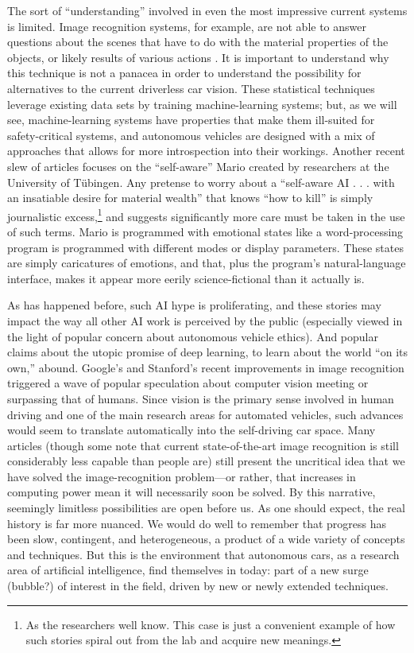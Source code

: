 The sort of ``understanding''
involved in even the most impressive current systems is limited. Image
recognition systems, for example, are not
able to answer questions about the scenes that have to do with
the material properties of the objects, or likely results of various
actions \cite{gomesJordan}. It is important to understand why this technique is not a
panacea in order to understand the possibility for alternatives to the current
driverless car vision. These statistical techniques leverage existing data
sets by training machine-learning systems; but, as we will see,
machine-learning systems have properties that make them ill-suited for
safety-critical systems, and autonomous vehicles are designed with a
mix of approaches that allows for more introspection into their
workings. Another recent slew of articles focuses on
the ``self-aware'' Mario created by researchers at the University of
T\"{u}bingen. Any pretense to worry about a ``self-aware AI . . . with
an insatiable desire for material wealth'' that knows ``how to kill'' \cite{vincentMario}
is simply journalistic excess,\footnote{As the
  researchers well know. This case is just a convenient example of how
such stories spiral out from the lab and acquire new meanings.} and suggests
significantly more care must be taken in the use of such terms. Mario
is programmed with emotional states like a word-processing program is
programmed with different modes or display parameters. These states
are simply caricatures of emotions, and that, plus the program's
natural-language interface, makes it appear more eerily science-fictional than it
actually is.

As has happened before, such AI hype is proliferating, and these
stories may impact the way all other AI work is
perceived by the public (especially viewed in the light of
popular concern about autonomous vehicle ethics). And popular claims
about the utopic promise of deep learning, to
learn about the world ``on its own,''
abound. Google's and Stanford's recent
improvements in image recognition \cite{markoffImage} triggered a wave
of popular speculation about computer vision meeting or surpassing
that of humans. Since vision is the primary sense involved in human driving
and one of the main research areas for automated vehicles, such
advances would seem to translate automatically into the self-driving
car space. Many articles (though some note that current
state-of-the-art image recognition is still considerably less capable
than people are) still present the uncritical idea that we have solved
the image-recognition problem---or rather, that increases in computing
power mean it will necessarily soon be solved. By this narrative, seemingly limitless
possibilities are open before us. As one should expect, the real
history is far more nuanced. We would do well to remember that
progress has been slow, contingent, and heterogeneous, a product of a
wide variety of concepts and techniques. But
this is the environment that autonomous cars, as a
research area of artificial intelligence, find themselves in today:
part of a new surge (bubble?) of interest in the field, driven by new
or newly extended techniques. 


